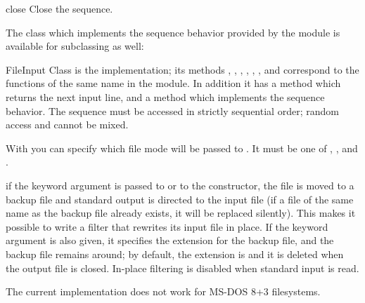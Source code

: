 \begin{funcdesc}{close}{}
  Close the sequence.
\end{funcdesc}


The class which implements the sequence behavior provided by the
module is available for subclassing as well:

\begin{classdesc}{FileInput}{}
  Class  is the implementation; its methods
  , , ,
  , , ,
   and  correspond to the functions
  of the same name in the module.
  In addition it has a  method which
  returns the next input line, and a  method
  which implements the sequence behavior.  The sequence must be
  accessed in strictly sequential order; random access and
   cannot be mixed.

  With  you can specify which file mode will be passed to
  . It must be one of , ,
   and .

\end{classdesc}

 if the keyword argument
 is passed to  or to the
 constructor, the file is moved to a backup file and
standard output is directed to the input file (if a file of the same
name as the backup file already exists, it will be replaced silently).
This makes it possible to write a filter that rewrites its input file
in place.  If the keyword argument  is also given, it specifies the extension for the backup
file, and the backup file remains around; by default, the extension is
 and it is deleted when the output file is closed.  In-place
filtering is disabled when standard input is read.

 The current implementation does not work for MS-DOS
8+3 filesystems.
